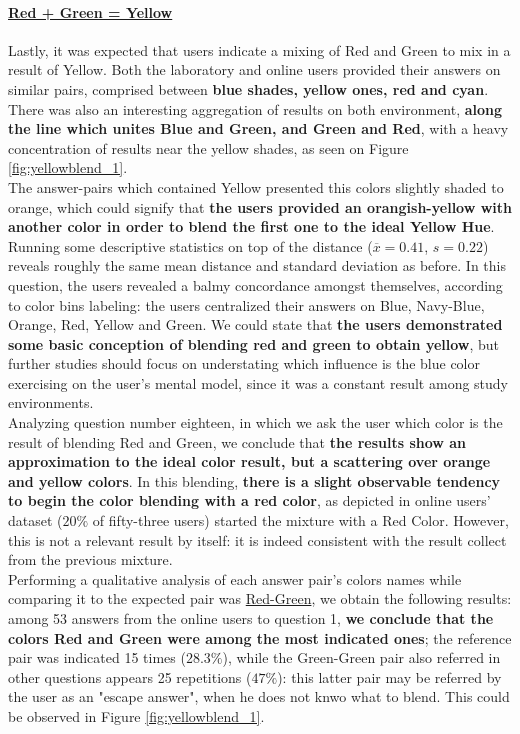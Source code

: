 \paragraph{\ul{Red + Green = Yellow}}
%
Lastly, it was expected that users indicate a mixing of Red and Green to mix in a result of Yellow. Both the laboratory and online users provided their answers on similar pairs, comprised between \textbf{blue shades, yellow ones, red and cyan}. There was also an
interesting aggregation of results on both environment, \textbf{along the line which unites Blue and Green, and Green and Red}, with a heavy concentration of results near the yellow shades, as seen on Figure \ref{fig:yellowblend_1}. \\
%
The answer-pairs which contained Yellow presented this colors slightly shaded to orange, which could signify that \textbf{the users provided an orangish-yellow with another color in order to blend the first one to the ideal Yellow Hue}. \\
%
Running some descriptive statistics on top of the distance ($\overline{x} = 0.41$, $s = 0.22$) reveals roughly the same mean distance and standard deviation as before. In this question, the users revealed a balmy concordance amongst themselves, according to color bins
labeling: the users centralized their answers on Blue, Navy-Blue, Orange, Red, Yellow and Green. We could state that \textbf{the users demonstrated some basic conception of blending red and green to obtain yellow}, but further studies should focus on understating which
influence is the blue color exercising on the user's mental model, since it was a constant result among study environments. \\
%
Analyzing question number eighteen, in which we ask the user which color is the result of blending Red and Green, we conclude that \textbf{the results show an approximation to the ideal color result, but a scattering over orange and yellow colors}.
In this blending, \textbf{there is a slight observable tendency to begin the color blending with a red color}, as depicted in online users' dataset ($20\%$ of fifty-three users) started the mixture with a Red Color. However, this is not a relevant result by itself: it is
indeed consistent with the result collect from the previous mixture. \\
%
Performing a qualitative analysis of each answer pair's colors names while comparing it to the expected pair was
\ul{Red-Green}, we obtain the following results: among 53 answers from the online users to question 1, \textbf{we conclude
that the colors Red and Green were among the most indicated ones}; the reference pair was indicated 15 times ($28.3\%$),
while the Green-Green pair also referred in other questions appears 25 repetitions ($47\%$): this latter pair may be referred
by the user as an "escape answer", when he does not knwo what to blend. This could be observed in Figure \ref{fig:yellowblend_1}.

